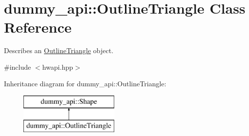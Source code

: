 \hypertarget{classdummy__api_1_1OutlineTriangle}{}\section{dummy\+\_\+api\+:\+:Outline\+Triangle Class Reference}
\label{classdummy__api_1_1OutlineTriangle}


Describes an \mbox{\hyperlink{classdummy__api_1_1OutlineTriangle}{Outline\+Triangle}} object.  




{\ttfamily \#include $<$hwapi.\+hpp$>$}

Inheritance diagram for dummy\+\_\+api\+:\+:Outline\+Triangle\+:\begin{figure}[H]
\begin{center}
\leavevmode
\includegraphics[height=2.000000cm]{classdummy__api_1_1OutlineTriangle}
\end{center}
\end{figure}
